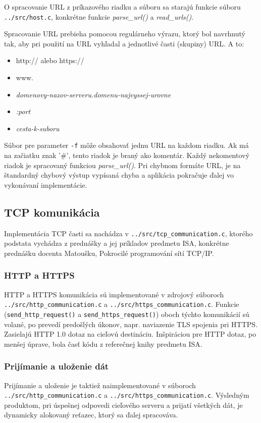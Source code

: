 O spracovanie URL z príkazového riadku a súboru sa starajú funkcie súboru {\tt ../src/host.c}, konkrétne funkcie {\it parse\_url()} a {\it read\_urls()}. 

Spracovanie URL prebieha pomocou regulárneho výrazu\cite{regexMan}, ktorý bol navrhnutý tak, aby pri použití na URL vyhľadal a jednotlivé časti (skupiny) URL. A to:
\begin{itemize}
  \item{http:// alebo https://}
  \item{www.}
  \item{{\it domenovy-nazov-serveru.domenu-najvyssej-urovne}}
  \item{{\it :port}}
  \item{{\it cesta-k-suboru}}
\end{itemize}

\noindent Súbor pre parameter {\tt -f} môže obsahovať jednu URL na každom riadku. Ak má na začiatku znak '\#', tento riadok je braný ako komentár. Každý nekomentový riadok je spracovaný funkciou {\it parse\_url()}. Pri chybnom formáte URL, je na štandardný chybový výstup vypísaná chyba a aplikácia pokračuje ďalej vo vykonávaní implementácie.

\subsection*{TCP komunikácia}
Implementácia TCP časti sa nachádza v {\tt ../src/tcp\_communication.c}, ktorého podstata vychádza z prednášky a jej príkladov predmetu ISA, konkrétne prednášku docenta Matoušku, Pokrocilé programování sítí TCP/IP\cite{Matousek}. 

\subsubsection{HTTP a HTTPS}
HTTP a HTTPS komunikácia sú implementované v zdrojový súboroch 
\\{\tt ../src/http\_communication.c} a {\tt ../src/https\_communication.c}. Funkcie
\\({\tt send\_http\_request()} a {\tt send\_https\_request()}) oboch týchto komunikácií sú volané, po prevedí predošlých úkonov, napr. naviazenie TLS spojenia pri HTTPS. Zasielajú HTTP 1.0 dotaz na cieľovú destináciu. Inšpiráciou pre HTTP dotaz, po menšej úprave, bola časť kódu z referečnej knihy predmetu ISA\cite{Winkle}.
\subsubsection{Prijímanie a uloženie dát}
Prijímanie a uloženie je taktiež naimplementované v súboroch
\\{\tt ../src/http\_communication.c} a {\tt ../src/https\_communication.c}. Výsledným produktom, pri úspešnej odpovedi cieľového serveru a prijatí všetkých dát, je dynamicky alokovaný reťazec, ktorý sa ďalej spracováva.

